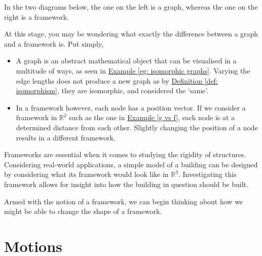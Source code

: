 
\begin{example}
\label{g vs f}
In the two diagrams below, the one on the left is a graph, whereas the one on the right is a framework.
    \begin{figure}[h]
        \centering
        
    \end{figure}
\end{example}
\vspace{-8 mm}
\begin{flushleft}
At this stage, you may be wondering what exactly the difference between a graph and a framework is. Put simply,
\begin{itemize}
    \item A graph is an abstract mathematical object that can be visualised in a multitude of ways, as seen in \hyperref[eg: isomorphic graphs]{Example \ref*{eg: isomorphic graphs}}. Varying the edge lengths does not produce a new graph as by \hyperref[def: isomorphism]{Definition \ref*{def: isomorphism}}, they are isomorphic, and considered the `same'.
    \vspace{-3mm}
    \item In a framework however, each node has a position vector. If we consider a framework in $\mathbb{R}^2$ such as the one in \hyperref[g vs f]{Example \ref*{g vs f}}, each node is at a determined distance from each other. Slightly changing the position of a node results in a different framework.

\end{itemize}
\end{flushleft}

\begin{flushleft}
Frameworks are essential when it comes to studying the rigidity of structures. Considering real-world applications, a simple model of a building can be designed by considering what its framework would look like in $\mathbb{R}^3$. Investigating this framework allows for insight into how the building in question should be built.
\end{flushleft}

\noindent
Armed with the notion of a framework, we can begin thinking about how we might be able to change the shape of a framework. 

\section{Motions}

